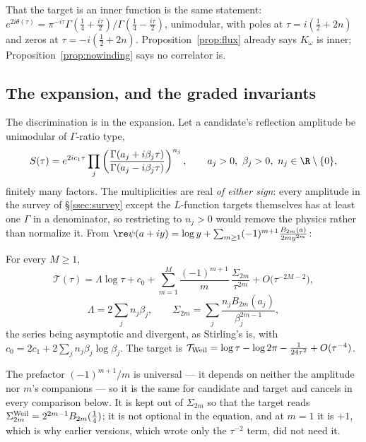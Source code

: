 That the target is an inner function is the same statement:
$e^{2i\theta(\tau)}=\pi^{-i\tau}\Gamma(\frac14+\frac{i\tau}2)/
\Gamma(\frac14-\frac{i\tau}2)$, unimodular, with poles at $\tau=i(\frac12+2n)$ and
zeros at $\tau=-i(\frac12+2n)$. Proposition~\ref{prop:flux} already says
$K_\omega$ is inner; Proposition~\ref{prop:nowinding} says no correlator is.

\subsection{The expansion, and the graded invariants}\label{ssec:invariants}

The discrimination is in the expansion. Let a candidate's reflection amplitude be
unimodular of $\Gamma$-ratio type,
\begin{equation}\label{eq:gammaratio}
 S(\tau)=e^{2ic_1\tau}\prod_j
 \left(\frac{\Gamma(a_j+i\beta_j\tau)}{\Gamma(a_j-i\beta_j\tau)}\right)^{n_j},
 \qquad a_j>0,\ \beta_j>0,\ n_j\in\R\setminus\{0\},
\end{equation}
finitely many factors. The multiplicities are real \emph{of either sign}: every
amplitude in the survey of \S\ref{ssec:survey} except the $L$-function targets
themselves has at least one $\Gamma$ in a denominator, so restricting to $n_j>0$
would remove the physics rather than normalize it. From
$\re\psi(a+iy)=\log y+\sum_{m\geq1}(-1)^{m+1}\frac{B_{2m}(a)}{2my^{2m}}$:

\begin{proposition}\label{prop:expansion}
For every $M\geq1$,
\[
 \mathcal T(\tau)=\Lambda\log\tau+c_0
 +\sum_{m=1}^{M}\frac{(-1)^{m+1}}{m}\,\frac{\Sigma_{2m}}{\tau^{2m}}
 +O\big(\tau^{-2M-2}\big),
\]
\[
 \Lambda=2\sum_jn_j\beta_j,\qquad
 \Sigma_{2m}=\sum_j\frac{n_jB_{2m}(a_j)}{\beta_j^{2m-1}},
\]
the series being asymptotic and divergent, as Stirling's is,
with $c_0=2c_1+2\sum_jn_j\beta_j\log\beta_j$. The target is
$\mathcal T_{\rm Weil}=\log\tau-\log2\pi-\frac1{24\tau^2}+O(\tau^{-4})$.
\end{proposition}

The prefactor $(-1)^{m+1}/m$ is universal --- it depends on neither the amplitude
nor $m$'s companions --- so it is the same for candidate and target and cancels in
every comparison below. It is kept out of $\Sigma_{2m}$ so that the target reads
$\Sigma_{2m}^{\rm Weil}=2^{2m-1}B_{2m}(\frac14)$; it is not optional in the
equation, and at $m=1$ it is $+1$, which is why earlier versions, which wrote only
the $\tau^{-2}$ term, did not need it.

